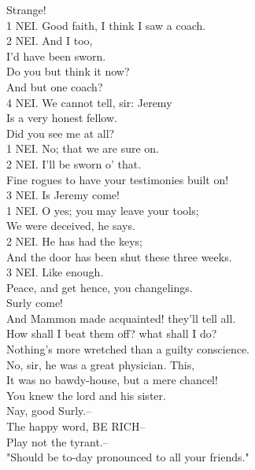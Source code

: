 \documentclass{memoir}
\begin{document}
\begin{drama*}
\lovewitspeaks  Strange!\\
1 NEI. Good faith, I think I saw a coach.\\
2 NEI. And I too,\\
 I'd have been sworn.\\
\lovewitspeaks {} Do you but think it now?\\
 And but one coach?\\
4 NEI. We cannot tell, sir: Jeremy\\
 Is a very honest fellow.\\
\facespeaks {} Did you see me at all?\\
1 NEI. No; that we are sure on.\\
2 NEI. I'll be sworn o' that.\\
\lovewitspeaks  Fine rogues to have your testimonies built on!\\
3 NEI. Is Jeremy come!\\
1 NEI. O yes; you may leave your tools;\\
 We were deceived, he says.\\
2 NEI. He has had the keys;\\
 And the door has been shut these three weeks.\\
3 NEI. Like enough.\\
\lovewitspeaks {} Peace, and get hence, you changelings.\\
\facespeaks {} Surly come!\\
 And Mammon made acquainted! they'll tell all.\\
 How shall I beat them off? what shall I do?\\
 Nothing's more wretched than a guilty conscience.\\
\surlyspeaks  No, sir, he was a great physician. This,\\
 It was no bawdy-house, but a mere chancel!\\
 You knew the lord and his sister.\\
\mammonspeaks {} Nay, good Surly.--\\
\surlyspeaks  The happy word, BE RICH--\\
\mammonspeaks {} Play not the tyrant.--\\
\surlyspeaks  "Should be to-day pronounced to all your friends."\\

\end{drama*}
\end{document}
